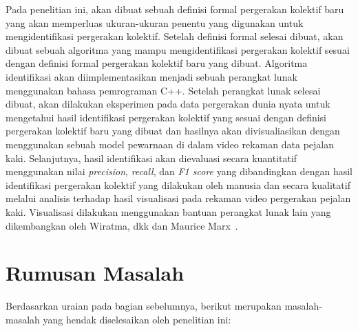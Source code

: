 Pada penelitian ini, akan dibuat sebuah definisi formal pergerakan kolektif baru yang akan memperluas ukuran-ukuran penentu yang digunakan untuk mengidentifikasi pergerakan kolektif. Setelah definisi formal selesai dibuat, akan dibuat sebuah algoritma yang mampu mengidentifikasi pergerakan kolektif sesuai dengan definisi formal pergerakan kolektif baru yang dibuat. Algoritma identifikasi akan diimplementasikan menjadi sebuah perangkat lunak menggunakan bahasa pemrograman C++. Setelah perangkat lunak selesai dibuat, akan dilakukan eksperimen pada data pergerakan dunia nyata untuk mengetahui hasil identifikasi pergerakan kolektif yang sesuai dengan definisi pergerakan kolektif baru yang dibuat dan hasilnya akan divisualiasikan dengan menggunakan sebuah model pewarnaan di dalam video rekaman data pejalan kaki. Selanjutnya, hasil identifikasi akan dievaluasi secara kuantitatif menggunakan nilai \textit{precision}, \textit{recall}, dan \textit{F1 score} yang dibandingkan dengan hasil identifikasi pergerakan kolektif yang dilakukan oleh manusia dan secara kualitatif melalui analisis terhadap hasil visualisasi pada rekaman video pergerakan pejalan kaki. Visualisasi dilakukan menggunakan bantuan perangkat lunak lain yang dikembangkan oleh Wiratma, dkk dan Maurice Marx~\cite{wiratma:software}.

\iffalse

\lionov{tambahin bahwa setelah itu akan dilakukan eksperimen dengan data nyata lintasan yang tersedia di internet (lihat bab 5 di thesis) dan akan dibandingkan hasilnya dengan hasil dari eksperimen sebelumnya (jangna lupa jelasin bahwa di eksperimen sebelumnya, yang dibandingkan itu cuma grup, gak ngebandingin tempat dan waktu). Terus harus disinggung bahwa di data eksperimen itu, udah ada grup yang ditentukan oleh manusia, jadi nanti hasil program akan dibandingkan dengan kunci jawabannya.} \cristopher{Di atas kan udah saya sebuat kalo identifikasinya akan diuji dengan dibandingkan, kalo gitu kudu rephrase atau biarin ajah ko?}

\fi

\section{Rumusan Masalah}
\label{sec:rumusan}

Berdasarkan uraian pada bagian sebelumnya, berikut merupakan masalah-masalah yang hendak diselesaikan oleh penelitian ini:
\iffalse


